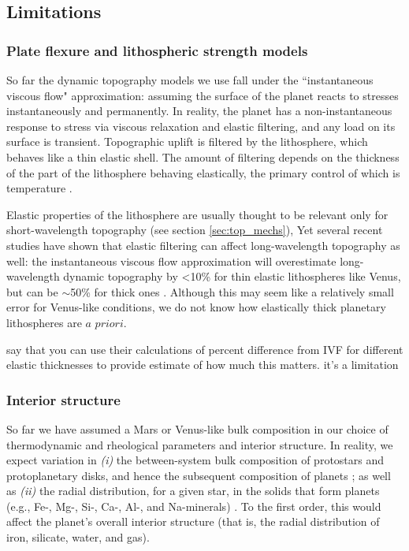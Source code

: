 \subsection{Limitations}

\subsubsection{Plate flexure and lithospheric strength models} \label{sec:future-elastic}

So far the dynamic topography models we use fall under the ``instantaneous viscous flow" approximation: assuming the surface of the planet reacts to stresses instantaneously and permanently. In reality, the planet has a non-instantaneous response to stress via viscous relaxation and elastic filtering, and any load on its surface is transient. Topographic uplift is filtered by the lithosphere, which behaves like a thin elastic shell. The amount of filtering depends on the thickness of the part of the lithosphere behaving elastically, the primary control of which is temperature \citep{Watts2001}.

Elastic properties of the lithosphere are usually thought to be relevant only for short-wavelength topography (see section \ref{sec:top_mechs}), Yet several recent studies have shown that elastic filtering can affect long-wavelength topography as well: the instantaneous viscous flow approximation will overestimate long-wavelength dynamic topography by \textless10\% for thin elastic lithospheres like Venus, but can be $\sim$50\% for thick ones \citep{Zhong2002, Golle2012, Dumoulin2013}. Although this may seem like a relatively small error for Venus-like conditions, we do not know how elastically thick planetary lithospheres are $\textit{a priori}$.

{\color{red} say that you can use their calculations of percent difference from IVF for different elastic thicknesses to provide estimate of how much this matters. it's a limitation}

\subsubsection{Interior structure}\label{sec:future-exoticplanets}

So far we have assumed a Mars or Venus-like bulk composition in our choice of thermodynamic and rheological parameters and interior structure. In reality, we expect variation in \textit{(i)} the between-system bulk composition of protostars and protoplanetary disks, and hence the subsequent composition of planets \citep{Bitsch2020}; as well as \textit{(ii)} the radial distribution, for a given star, in the solids that form planets (e.g., Fe-, Mg-, Si-, Ca-, Al-, and Na-minerals) \citep{Dorn2019, Miyazaki2020}. To the first order, this would affect the planet's overall interior structure (that is, the radial distribution of iron, silicate, water, and gas).

